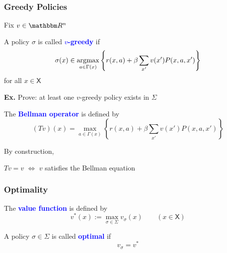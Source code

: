 \documentclass[xcolor=dvipsnames]{beamer}
\newcommand{\navy}[1]{\textcolor{Blue}{\bf #1}}
\newcommand{\Ex}{{\bf Ex. }}
\newcommand{\RR}{\mathbbm R}
\newcommand{\Xsf}{\mathsf X}
\newcommand{\argmax}{\operatornamewithlimits{argmax}}
\newcommand{\1}{\mathbbm 1}
\begin{document}
\begin{frame}
    \frametitle{Greedy Policies}

    Fix $v \in \RR^n$ 
    
    \vspace{0.5em}
    \vspace{0.5em}
    \vspace{0.5em}
    A policy $\sigma$ is called
    \navy{$v$-greedy} if
    \begin{equation*}
        \sigma(x)
        \in \argmax_{a \in \Gamma(x)}
        \left\{
            r(x, a)
            + \beta
            \sum_{x'} v(x') P(x, a, x')
        \right\}
    \end{equation*}
    for all $x \in \Xsf$

    \vspace{0.5em}
    \vspace{0.5em}
    \vspace{0.5em}
    \Ex Prove: at least one $v$-greedy policy exists in $\Sigma$


\end{frame}


\begin{frame}
    
    \vspace{0.5em}
    The \navy{Bellman operator} is  defined by
    \begin{equation*}
        (Tv)(x)
            = \max_{a \in \Gamma(x)}
            \left\{
                r(x, a)
                + \beta
                \sum_{x' } v(x') P(x, a, x')
            \right\}
    \end{equation*}

    \vspace{0.5em}
    \vspace{0.5em}
    \vspace{0.5em}

    By construction, 

    \begin{center}
        $Tv=v$ $\iff$ $v$  satisfies the Bellman equation
    \end{center}

\end{frame}


\begin{frame}
    \frametitle{Optimality}

    \vspace{0.5em}
    The \navy{value function} is defined by
    \begin{equation*}
        v^*(x) := \max_{\sigma \in \Sigma} v_\sigma(x)
        \qquad (x \in \Xsf)
    \end{equation*}

    \vspace{0.5em}
    \vspace{0.5em}
    A policy $\sigma \in \Sigma$ is called \navy{optimal} if
    \begin{equation*}
        v_\sigma = v^*
    \end{equation*}

\end{frame}
\end{document}
